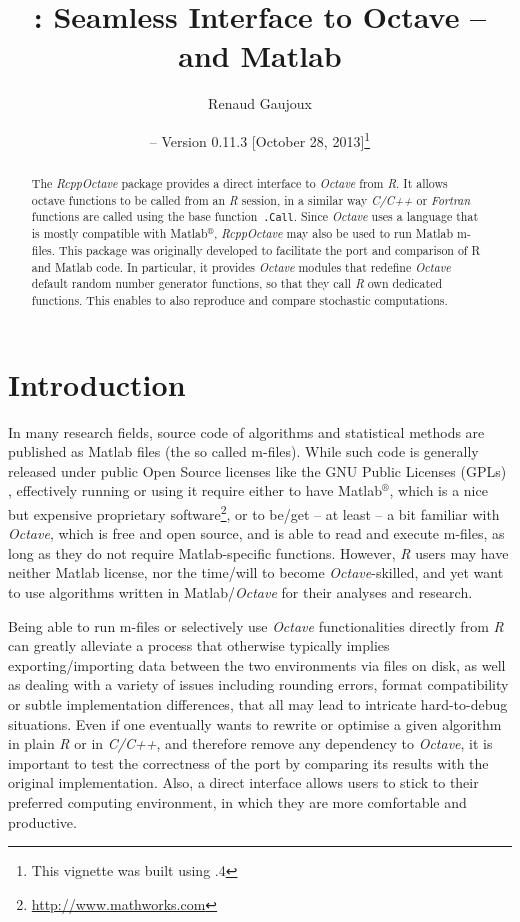\documentclass[english,10pt,a4paper]{article}\usepackage[]{graphicx}\usepackage[]{color}
\author{Renaud Gaujoux}
\title{\pkgname{RcppOctave}: Seamless Interface to Octave -- and Matlab}
\date{\Rpkg{RcppOctave} -- Version 0.11.3
[October 28, 2013]\footnote{This vignette was built using \octave
3.6.4}}
\newcommand{\matlab}{Matlab$^\circledR$\xspace}
\let\proglang=\textit
\let\code=\texttt
\newcommand{\pkgname}[1]{\textit{#1}\xspace}
\newcommand{\Rpkg}[1]{\pkgname{#1} package\xspace}
\newcommand{\R}{\proglang{R}\xspace}
\newcommand{\octave}{\proglang{Octave}\xspace}
\begin{document}
\maketitle

\begin{abstract}
The \Rpkg{RcppOctave} provides a direct interface to \octave from
\R.
It allows \\octave functions to be called from an \R session,
in a similar way \proglang{C/C++} or \proglang{Fortran} functions are called using the base function~\code{.Call}.
Since \octave uses a language that is mostly compatible with \matlab,
\pkgname{RcppOctave} may also be used to run Matlab m-files.
This package was originally developed to facilitate the port and comparison of R
and Matlab code.
In particular, it provides \octave modules that redefine
\octave default random number generator functions, so that they call
\proglang{R} own dedicated functions.
This enables to also reproduce and compare stochastic computations.
\end{abstract}

\noindent\hrulefill
\tableofcontents
\noindent\hrulefill

\section{Introduction}

In many research fields, source code of algorithms and statistical methods are
published as Matlab files (the so called m-files).
While such code is generally released under public Open Source licenses like the
GNU Public Licenses (GPLs) \cite{gnuGPL}, effectively running or using it
require either to have \matlab, which is a nice but expensive proprietary
software\footnote{\url{http://www.mathworks.com}}, or to be/get -- at least -- a bit familiar with \octave \cite{Eaton2002}, which is free and open source, and is able to read and execute m-files, as long as they do not require Matlab-specific functions.
However, \proglang{R} users may have neither Matlab license, nor the
time/will to become \octave-skilled, and yet want to use algorithms written in
Matlab/\octave for their analyses and research.

Being able to run m-files or selectively use \octave functionalities
directly from \proglang{R} can greatly alleviate a process that otherwise
typically implies exporting/importing data between the two environments via
files on disk, as well as dealing with a variety of issues including
rounding errors, format compatibility or subtle implementation differences,
that all may lead to intricate hard-to-debug situations.
Even if one eventually wants to rewrite or optimise a given algorithm in plain
\proglang{R} or in \proglang{C/C++}, and therefore remove any dependency to
\octave, it is important to test the correctness of the port by
comparing its results with the original implementation.
Also, a direct interface allows users to stick to their preferred computing
environment, in which they are more comfortable and productive.
\end{document}
